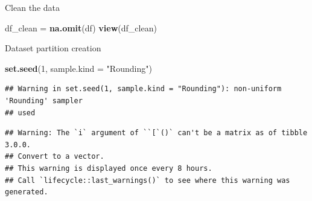 \documentclass[]{article}
\newenvironment{Shaded}{\begin{snugshade}}{\end{snugshade}}
\newcommand{\AlertTok}[1]{\textcolor[rgb]{0.94,0.16,0.16}{#1}}
\newcommand{\CommentTok}[1]{\textcolor[rgb]{0.56,0.35,0.01}{\textit{#1}}}
\newcommand{\DataTypeTok}[1]{\textcolor[rgb]{0.13,0.29,0.53}{#1}}
\newcommand{\DecValTok}[1]{\textcolor[rgb]{0.00,0.00,0.81}{#1}}
\newcommand{\FloatTok}[1]{\textcolor[rgb]{0.00,0.00,0.81}{#1}}
\newcommand{\KeywordTok}[1]{\textcolor[rgb]{0.13,0.29,0.53}{\textbf{#1}}}
\newcommand{\NormalTok}[1]{#1}
\newcommand{\OperatorTok}[1]{\textcolor[rgb]{0.81,0.36,0.00}{\textbf{#1}}}
\newcommand{\OtherTok}[1]{\textcolor[rgb]{0.56,0.35,0.01}{#1}}
\newcommand{\StringTok}[1]{\textcolor[rgb]{0.31,0.60,0.02}{#1}}
\begin{document}
Clean the data

\begin{Shaded}
\begin{Highlighting}[]
\NormalTok{df_clean =}\StringTok{ }\KeywordTok{na.omit}\NormalTok{(df)}
\KeywordTok{view}\NormalTok{(df_clean)}
\end{Highlighting}
\end{Shaded}

Dataset partition creation

\begin{Shaded}
\begin{Highlighting}[]
\KeywordTok{set.seed}\NormalTok{(}\DecValTok{1}\NormalTok{, }\DataTypeTok{sample.kind =} \StringTok{"Rounding"}\NormalTok{)}
\end{Highlighting}
\end{Shaded}

\begin{verbatim}
## Warning in set.seed(1, sample.kind = "Rounding"): non-uniform 'Rounding' sampler
## used
\end{verbatim}

\begin{Shaded}
\end{Shaded}

\begin{verbatim}
## Warning: The `i` argument of ``[`()` can't be a matrix as of tibble 3.0.0.
## Convert to a vector.
## This warning is displayed once every 8 hours.
## Call `lifecycle::last_warnings()` to see where this warning was generated.
\end{verbatim}

\begin{Shaded}
\end{Shaded}
\end{document}
